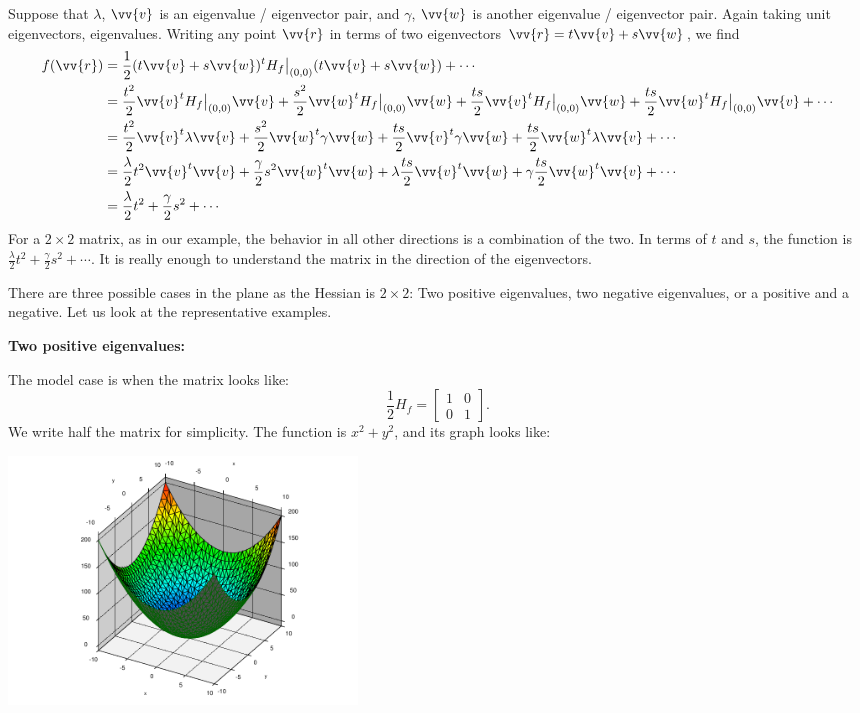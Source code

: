 \documentclass[12pt]{article}
\begin{document}
Suppose that $\lambda$, $\vv{v}$ is an eigenvalue / eigenvector pair,
and $\gamma$, $\vv{w}$ is another eigenvalue / eigenvector pair.  Again
taking unit eigenvectors, eigenvalues.
Writing any point $\vv{r}$ in terms of two eigenvectors
$\vv{r} = t \vv{v} + s \vv{w}$, we find
\[
\begin{split}
f(\vv{r}) & = 
\frac{1}{2} (t \vv{v} + s \vv{w})^{t} H_f\big|_{(0,0)} (t \vv{v} + s \vv{w})
+
\cdots 
\\
& =
\frac{t^2}{2} \vv{v}^{t} H_f\big|_{(0,0)} \vv{v}
+
\frac{s^2}{2} \vv{w}^{t} H_f\big|_{(0,0)} \vv{w}
+
\frac{ts}{2} \vv{v}^{t} H_f\big|_{(0,0)} \vv{w}
+
\frac{ts}{2} \vv{w}^{t} H_f\big|_{(0,0)} \vv{v}
+
\cdots 
\\
& =
\frac{t^2}{2} \vv{v}^{t} \lambda \vv{v}
+
\frac{s^2}{2} \vv{w}^{t} \gamma \vv{w}
+
\frac{ts}{2} \vv{v}^{t} \gamma \vv{w}
+
\frac{ts}{2} \vv{w}^{t} \lambda \vv{v}
+
\cdots 
\\
& =
\frac{\lambda}{2} t^2 \vv{v}^{t} \vv{v}
+
\frac{\gamma}{2} s^2 \vv{w}^{t} \vv{w}
+
\lambda \frac{ts}{2} \vv{v}^{t} \vv{w}
+
\gamma \frac{ts}{2} \vv{w}^{t} \vv{v}
+
\cdots 
\\
& =
\frac{\lambda}{2} t^2
+
\frac{\gamma}{2} s^2
+
\cdots 
\end{split}
\]
For a $2 \times 2$ matrix, as in our example, the behavior
in all other directions is a combination of the two.  In terms
of $t$ and $s$, the function is $\frac{\lambda}{2} t^2 + \frac{\gamma}{2}
s^2 + \cdots$.
It is really
enough to understand the matrix in the direction of the eigenvectors.

There are three possible cases in the plane as the Hessian
is $2 \times 2$:  Two positive eigenvalues,
two negative eigenvalues, or a positive and a negative.
Let us look at the representative examples.

\bigskip

\textbf{Two positive eigenvalues:}
\nopagebreak

The model case is when the matrix looks like:
\[
\frac{1}{2} H_f
=
\begin{bmatrix}
1 & 0 \\
0 & 1
\end{bmatrix} .
\]
We write half the matrix for simplicity.
The function is $x^2+y^2$, and
its graph looks like:
\begin{center}
\includegraphics[width=3.65in]{xsqplusysq}
\end{center}
\end{document}
